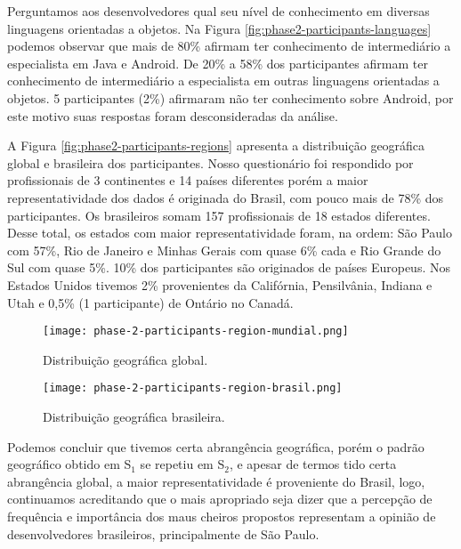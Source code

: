 Perguntamos aos desenvolvedores qual seu nível de conhecimento em diversas linguagens orientadas a objetos. Na Figura \ref{fig:phase2-participants-languages} podemos observar que mais de 80\% afirmam ter conhecimento de intermediário a especialista em Java e Android. De 20\% a 58\% dos participantes afirmam ter conhecimento de intermediário a especialista em outras linguagens orientadas a objetos. 5 participantes (2\%) afirmaram não ter conhecimento sobre Android, por este motivo suas respostas foram desconsideradas da análise. 

A Figura \ref{fig:phase2-participants-regions} apresenta a distribuição geográfica global e brasileira dos participantes. Nosso questionário foi respondido por profissionais de 3 continentes e 14 países diferentes porém a maior representatividade dos dados é originada do Brasil, com pouco mais de 78\% dos participantes. Os brasileiros somam 157 profissionais de 18 estados diferentes. Desse total, os estados com maior representatividade foram, na ordem: São Paulo com 57\%, Rio de Janeiro e Minhas Gerais com quase 6\% cada e Rio Grande do Sul com quase 5\%. 10\% dos participantes são originados de países Europeus. Nos Estados Unidos tivemos 2\% provenientes da Califórnia, Pensilvânia, Indiana e Utah e 0,5\% (1 participante) de Ontário no Canadá. \\

\begin{figure*}[!htb]
\centering
\vspace{-.3cm} 
\begin{subfigure}{.52\textwidth}
  \centering
  \texttt{[image: phase-2-participants-region-mundial.png]}
  \caption{Distribuição geográfica global.}
  \label{fig:phase2-participants-regions-global}
\end{subfigure}
\begin{subfigure}{.46\textwidth}
  \centering
  \texttt{[image: phase-2-participants-region-brasil.png]}
  \caption{Distribuição geográfica brasileira.}
  \label{fig:phase2-participants-regions-brasil}
\end{subfigure}%
\caption{Distribuição geográfica global e brasileira dos participantes de S$_2$.}
\label{fig:phase2-participants-regions}
\end{figure*}

Podemos concluir que tivemos certa abrangência geográfica, porém o padrão geográfico obtido em S$_1$ se repetiu em S$_2$, e apesar de termos tido certa abrangência global, a maior representatividade é proveniente do Brasil, logo, continuamos acreditando que o mais apropriado seja dizer que a percepção de frequência e importância dos maus cheiros propostos representam a opinião de desenvolvedores brasileiros, principalmente de São Paulo.


